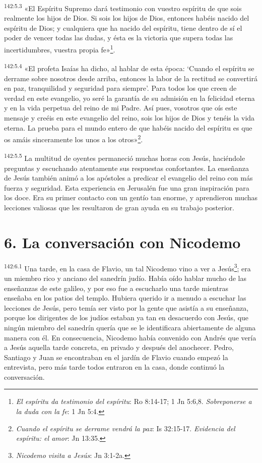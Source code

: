 \par 
\textsuperscript{142:5.3} «El Espíritu Supremo dará testimonio con vuestro espíritu de que sois realmente los hijos de Dios. Si sois los hijos de Dios, entonces habéis nacido del espíritu de Dios; y cualquiera que ha nacido del espíritu, tiene dentro de sí el poder de vencer todas las dudas, y ésta es la victoria que supera todas las incertidumbres, vuestra propia fe»\footnote{\textit{El espíritu da testimonio del espíritu}: Ro 8:14-17; 1 Jn 5:6,8. \textit{Sobreponerse a la duda con la fe}: 1 Jn 5:4.}.

\par 
\textsuperscript{142:5.4} «El profeta Isaías ha dicho, al hablar de esta época: `Cuando el espíritu se derrame sobre nosotros desde arriba, entonces la labor de la rectitud se convertirá en paz, tranquilidad y seguridad para siempre'. Para todos los que creen de verdad en este evangelio, yo seré la garantía de su admisión en la felicidad eterna y en la vida perpetua del reino de mi Padre. Así pues, vosotros que oís este mensaje y creéis en este evangelio del reino, sois los hijos de Dios y tenéis la vida eterna. La prueba para el mundo entero de que habéis nacido del espíritu es que os amáis sinceramente los unos a los otros»\footnote{\textit{Cuando el espíritu se derrame vendrá la paz}: Is 32:15-17. \textit{Evidencia del espíritu: el amor}: Jn 13:35.}.

\par 
\textsuperscript{142:5.5} La multitud de oyentes permaneció muchas horas con Jesús, haciéndole preguntas y escuchando atentamente sus respuestas confortantes. La enseñanza de Jesús también animó a los apóstoles a predicar el evangelio del reino con más fuerza y seguridad. Esta experiencia en Jerusalén fue una gran inspiración para los doce. Era su primer contacto con un gentío tan enorme, y aprendieron muchas lecciones valiosas que les resultaron de gran ayuda en su trabajo posterior.

\section*{6. La conversación con Nicodemo}
\par 
\textsuperscript{142:6.1} Una tarde, en la casa de Flavio, un tal Nicodemo vino a ver a Jesús\footnote{\textit{Nicodemo visita a Jesús}: Jn 3:1-2a.}; era un miembro rico y anciano del sanedrín judío. Había oído hablar mucho de las enseñanzas de este galileo, y por eso fue a escucharlo una tarde mientras enseñaba en los patios del templo. Hubiera querido ir a menudo a escuchar las lecciones de Jesús, pero temía ser visto por la gente que asistía a su enseñanza, porque los dirigentes de los judíos estaban ya tan en desacuerdo con Jesús, que ningún miembro del sanedrín quería que se le identificara abiertamente de alguna manera con él. En consecuencia, Nicodemo había convenido con Andrés que vería a Jesús aquella tarde concreta, en privado y después del anochecer. Pedro, Santiago y Juan se encontraban en el jardín de Flavio cuando empezó la entrevista, pero más tarde todos entraron en la casa, donde continuó la conversación.

